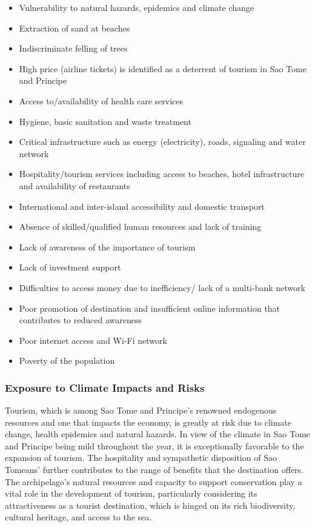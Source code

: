 \documentclass[
]{book}
\providecommand{\tightlist}{%
  \setlength{\itemsep}{0pt}\setlength{\parskip}{0pt}}
\begin{document}
\begin{itemize}
\tightlist
\item
  Vulnerability to natural hazards, epidemics and climate change
\item
  Extraction of sand at beaches
\item
  Indiscriminate felling of trees
\item
  High price (airline tickets) is identified as a deterrent of tourism in Sao Tome and Principe
\item
  Access to/availability of health care services
\item
  Hygiene, basic sanitation and waste treatment
\item
  Critical infrastructure such as energy (electricity), roads, signaling and water network
\item
  Hospitality/tourism services including access to beaches, hotel infrastructure and availability of restaurants
\item
  International and inter-island accessibility and domestic transport
\item
  Absence of skilled/qualified human resources and lack of training
\item
  Lack of awareness of the importance of tourism
\item
  Lack of investment support
\item
  Difficulties to access money due to inefficiency/ lack of a multi-bank network
\item
  Poor promotion of destination and insufficient online information that contributes to reduced awareness
\item
  Poor internet access and Wi-Fi network
\item
  Poverty of the population
\end{itemize}

\hypertarget{exposure-to-climate-impacts-and-risks-2}{%
\subsubsection{Exposure to Climate Impacts and Risks}\label{exposure-to-climate-impacts-and-risks-2}}

Tourism, which is among Sao Tome and Principe's renowned endogenous resources and one that impacts the economy, is greatly at risk due to climate change, health epidemics and natural hazards. In view of the climate in Sao Tome and Principe being mild throughout the year, it is exceptionally favorable to the expansion of tourism. The hospitality and sympathetic disposition of Sao Tomeans' further contributes to the range of benefits that the destination offers. The archipelago's natural resources and capacity to support conservation play a vital role in the development of tourism, particularly considering its attractiveness as a tourist destination, which is hinged on its rich biodiversity, cultural heritage, and access to the sea.
\end{document}
